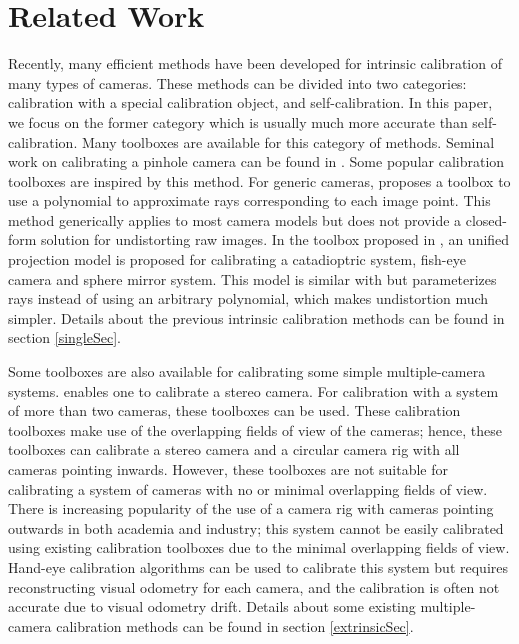 \documentclass{report}
\begin{document}
\section{Related Work}
Recently, many efficient methods have been developed for intrinsic calibration of many types of cameras. These methods can be divided into two categories: calibration with a special calibration object, and self-calibration. In this paper, we focus on the former category which is usually much more accurate than self-calibration. Many toolboxes are available for this category of methods. Seminal work on calibrating a pinhole camera can be found in \cite{zhang2000flexible}. Some popular calibration toolboxes \cite{bouguet2004camera,stoyanov2006camera} are inspired by this method. For generic cameras, \cite{scaramuzza2006toolbox} proposes a toolbox to use a polynomial to approximate rays corresponding to each image point. This method generically applies to most camera models but does not provide a closed-form solution for undistorting raw images. In the toolbox proposed in \cite{mei2007single}, an unified projection model is proposed for calibrating a catadioptric system, fish-eye camera and sphere mirror system. This model is similar with \cite{scaramuzza2006toolbox} but parameterizes rays instead of using an arbitrary polynomial, which makes undistortion much simpler. Details about the previous intrinsic calibration methods can be found in section \ref{singleSec}. 

Some toolboxes are also available for calibrating some simple multiple-camera systems. \cite{bouguet2004camera} enables one to calibrate a stereo camera. For calibration with a system of more than two cameras, these toolboxes \cite{svoboda2005convenient,easycal} can be used. These calibration toolboxes make use of the overlapping fields of view of the cameras; hence, these toolboxes can calibrate a stereo camera and a circular camera rig with all cameras pointing inwards. However, these toolboxes are not suitable for calibrating a system of cameras with no or minimal overlapping fields of view. There is increasing popularity of the use of a camera rig with cameras pointing outwards in both academia and industry; this system cannot be easily calibrated using existing calibration toolboxes due to the minimal overlapping fields of view. Hand-eye calibration algorithms \cite{tsai1989new,shiu1989calibration} can be used to calibrate this system but requires reconstructing visual odometry for each camera, and the calibration is often not accurate due to visual odometry drift. Details about some existing multiple-camera calibration methods can be found in section \ref{extrinsicSec}. 
\end{document}
